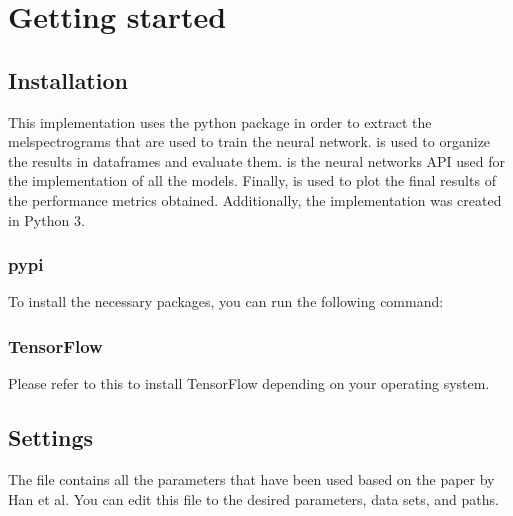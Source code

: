 \documentclass[letterpaper,10pt,english]{sphinxmanual}
\begin{document}
\chapter{Getting started}
\label{\detokenize{index:getting-started}}

\section{Installation}
\label{\detokenize{installing:installation}}\label{\detokenize{installing::doc}}
This implementation uses the  python package in order to extract the melspectrograms
that are used to train the neural network.  is used to organize the results in
dataframes and evaluate them.  is the neural networks API used for the implementation
of all the models. Finally,  is used to plot the final results of the performance
metrics obtained. Additionally, the implementation was created in Python 3.


\subsection{pypi}
\label{\detokenize{installing:pypi}}
To install the necessary packages, you can run the following command:

%
\begin{sphinxVerbatim}[commandchars=\\\{\}]
       
\end{sphinxVerbatim}


\subsection{TensorFlow}
\label{\detokenize{installing:tensorflow}}
Please refer to this  to install
TensorFlow depending on your operating system.


\section{Settings}
\label{\detokenize{settings:settings}}\label{\detokenize{settings::doc}}
The file  contains all the parameters that have been used based on the paper
by Han et al. You can edit this file to the desired parameters, data sets, and paths.
\end{document}
